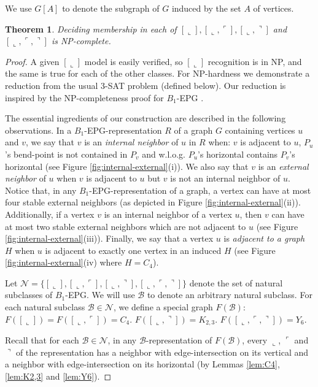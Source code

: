 \documentclass[11pt,3p,times]{elsarticle}
\newenvironment{myproof}{\begin{proof}}{\end{proof}}
\newcommand{\La}{\ensuremath{\llcorner}} \newcommand{\Lb}{\ensuremath{\ulcorner}} \newcommand{\Lc}{\ensuremath{\lrcorner}} \newcommand{\Ld}{\ensuremath{\urcorner}}
\newtheorem{theorem}{Theorem}
\begin{document}
We use $G[A]$ to denote the subgraph of $G$ induced by the set $A$
of vertices.

\begin{theorem}
Deciding membership in each of $[\La],
[\La,\Lb],[\La,\Ld]$ and $[\La,\Lb,\Ld]$  is NP-complete.
\end{theorem}
\begin{myproof}
A given $[\La]$ model is easily verified, so $[\La]$ recognition
is in NP, and the same is true for each of the other classes.
For NP-hardness we demonstrate a reduction from the
usual 3-SAT problem (defined below). Our reduction is inspired by
the NP-completeness proof for $B_1$-EPG \cite{Hel2010}.

The essential ingredients of our construction are described in the
following observations. In a $B_1$-EPG-representation $R$ of a
graph $G$ containing vertices $u$ and $v$, we say that $v$ is an
\emph{internal neighbor} of $u$ in $R$ when: $v$ is adjacent to
$u$, $P_u$'s bend-point is not contained in $P_v$ and w.l.o.g.
$P_u$'s horizontal contains $P_v$'s horizontal (see Figure
\ref{fig:internal-external}(i)). We also say that $v$ is an
\emph{external neighbor} of $u$ when $v$ is adjacent to $u$ but
$v$ is not an internal neighbor of $u$. Notice that, in any
$B_1$-EPG-representation of a graph, a vertex can have at most four
stable external neighbors (as depicted in Figure
\ref{fig:internal-external}(ii)). Additionally, if a vertex $v$ is
an internal neighbor of a vertex $u$, then $v$ can have at most
two stable external neighbors which are not adjacent to $u$ (see
Figure \ref{fig:internal-external}(iii)). Finally, we say that a
vertex $u$ is \emph{adjacent to a graph $H$} when $u$ is adjacent to
exactly one vertex in an induced $H$ (see Figure
\ref{fig:internal-external}(iv) where $H=C_4$).

Let $\mathcal{N}=\{[\La],[\La,\Lb],[\La,\Ld],[\La,\Lb,\Ld]\}$ denote
the set of natural subclasses of $B_1$-EPG.  We will use $\mathcal{B}$ to denote
an arbitrary natural subclass.  For each natural subclass
$\mathcal{B} \in \mathcal{N}$, we define a special graph $F(\mathcal{B})$:
$F([\La])=F([\La,\Lb])=C_4.$ $F([\La,\Ld])=K_{2,3}.$ $F([\La,\Lb,\Ld])=Y_6.$

Recall that for each $\mathcal{B} \in \mathcal{N}$, in any
$\mathcal{B}$-representation of $F(\mathcal{B})$, every $\La$, $\Lb$ and
$\Ld$ of the representation has a neighbor with edge-intersection on
its vertical and a neighbor with edge-intersection on its horizontal (by
Lemmas \ref{lem:C4}, \ref{lem:K2,3} and \ref{lem:Y6}).


\end{myproof}
\end{document}
